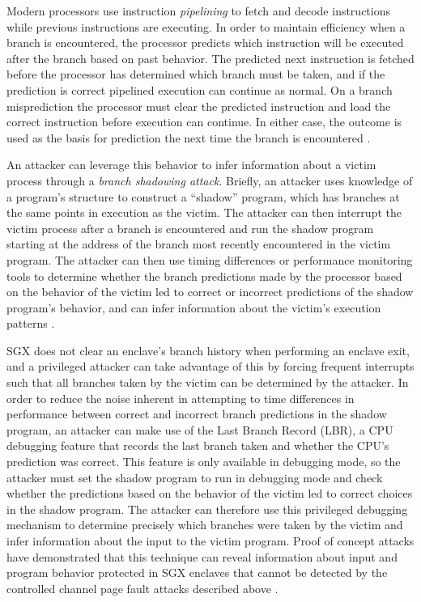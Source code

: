 Modern processors use instruction \emph{pipelining} to fetch and decode instructions while previous instructions are executing. In order to maintain efficiency when a branch is encountered, the processor predicts which instruction will be executed after the branch based on past behavior. The predicted next instruction is fetched before the processor has determined which branch must be taken, and if the prediction is correct pipelined execution can continue as normal. On a branch misprediction the processor must clear the predicted instruction and load the correct instruction before execution can continue. In either case, the outcome is used as the basis for prediction the next time the branch is encountered \cite{aciicmez_power_2007, lee_inferring_2017}. 

An attacker can leverage this behavior to infer information about a victim process through a \emph{branch shadowing attack}. Briefly, an attacker uses knowledge of a program's structure to construct a ``shadow'' program, which has branches at the same points in execution as the victim. The attacker can then interrupt the victim process after a branch is encountered and run the shadow program starting at the address of the branch most recently encountered in the victim program. The attacker can then use timing differences or performance monitoring tools to determine whether the branch predictions made by the processor based on the behavior of the victim led to correct or incorrect predictions of the shadow program's behavior, and can infer information about the victim's execution patterns \cite{lee_inferring_2017}.

SGX does not clear an enclave's branch history when performing an enclave exit, and a privileged attacker can take advantage of this by forcing frequent interrupts such that all branches taken by the victim can be determined by the attacker. In order to reduce the noise inherent in attempting to time differences in performance between correct and incorrect branch predictions in the shadow program, an attacker can make use of the Last Branch Record (LBR), a CPU debugging feature that records the last branch taken and whether the CPU's prediction was correct. This feature is only available in debugging mode, so the attacker must set the shadow program to run in debugging mode and check whether the predictions based on the behavior of the victim led to correct choices in the shadow program. The attacker can therefore use this privileged debugging mechanism to determine precisely which branches were taken by the victim and infer information about the input to the victim program. Proof of concept attacks have demonstrated that this technique can reveal information about input and program behavior protected in SGX enclaves that cannot be detected by the controlled channel page fault attacks described above \cite{lee_inferring_2017, shinde_preventing_2015}. 

